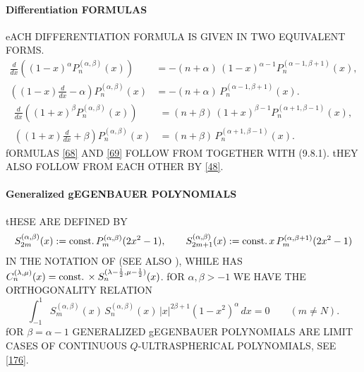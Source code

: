 \documentclass[twoside,11pt]{article}
\newcommand\al\alpha
\newcommand\be\beta
\newcommand\la\lambda
\newcommand\half{\frac12}
\newcommand\const{{\rm const.}\,}
\begin{document}
\paragraph{Differentiation FORMULAS} 
eACH DIFFERENTIATION FORMULA IS GIVEN IN TWO EQUIVALENT FORMS. 
\begin{equation} 
\begin{split} 
\frac d{dx}\left((1-x)^\al P_n^{(\al,\be)}(x)\right)&= 
-(n+\al)\,(1-x)^{\al-1} P_n^{(\al-1,\be+1)}(x),\\ 
\left((1-x)\frac d{dx}-\al\right)P_n^{(\al,\be)}(x)&= 
-(n+\al)\,P_n^{(\al-1,\be+1)}(x). 
\end{split} 
\label{68} 
\end{equation} 
% 
\begin{equation} 
\begin{split} 
\frac d{dx}\left((1+x)^\be P_n^{(\al,\be)}(x)\right)&= 
(n+\be)\,(1+x)^{\be-1} P_n^{(\al+1,\be-1)}(x),\\ 
\left((1+x)\frac d{dx}+\be\right)P_n^{(\al,\be)}(x)&= 
(n+\be)\,P_n^{(\al+1,\be-1)}(x). 
\end{split} 
\label{69} 
\end{equation} 
fORMULAS \eqref{68} AND \eqref{69} FOLLOW FROM 
TOGETHER WITH (9.8.1). tHEY ALSO FOLLOW FROM EACH OTHER BY \eqref{48}. 
% 
\paragraph{Generalized gEGENBAUER POLYNOMIALS} 
tHESE ARE DEFINED BY 
\begin{equation} 
S_{2m}^{(\al,\be)}(x):=\const P_m^{(\al,\be)}(2x^2-1),\qquad 
S_{2m+1}^{(\al,\be)}(x):=\const x\,P_m^{(\al,\be+1)}(2x^2-1) 
\label{70} 
\end{equation} 
IN THE NOTATION OF  
(SEE ALSO \cite{K27}), WHILE \cite[Section 1.5.2]{k26} 
HAS $C_n^{(\la,\mu)}(x)=\const\allowbreak\times S_n^{(\la-\half,\mu-\half)}(x)$. 
fOR $\al,\be>-1$ WE HAVE THE ORTHOGONALITY RELATION 
\begin{equation} 
\int_{-1}^1 S_m^{(\al,\be)}(x)\,S_n^{(\al,\be)}(x)\,|x|^{2\be+1}(1-x^2)^\al\,dx 
=0\qquad(m\ne N). 
\label{71} 
\end{equation} 
fOR $\be=\al-1$ GENERALIZED gEGENBAUER POLYNOMIALS ARE LIMIT CASES OF 
CONTINUOUS $Q$-ULTRASPHERICAL POLYNOMIALS, SEE \eqref{176}. 
 
\end{document}
